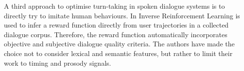 	A third approach to optimise turn-taking in spoken dialogue systems is to directly try to imitate human behaviours. In \cite{Kim2014} Inverse Reinforcement Learning is used to infer a reward function directly from user trajectories in a collected dialogue corpus. Therefore, the reward function automatically incorporates objective and subjective dialogue quality criteria. The authors have made the choice not to consider lexical and semantic features, but rather to limit their work to timing and prosody signals.
	

